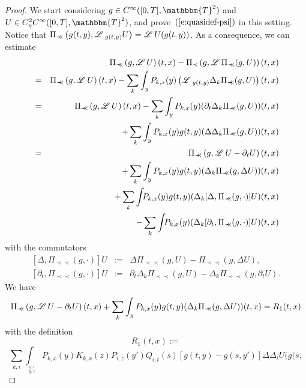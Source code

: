 \documentclass{amsart}
\newcommand{\assign}{:=}
\newcommand{\precprec}{\prec\!\!\!\prec}
\theoremstyle{remark}
\theoremstyle{definition}
\newcommand{\LL}{\mathscr{L} \hspace{.2em}}
\begin{document}
\begin{proof}
  We start considering $g \in C^{\infty} ([0, T], \mathbbm{T}^2)$ and $U \in
  C_{\eta}^2 C^{\infty} ([0, T], \mathbbm{T}^2)$, and
  prove~$(\ref{e:quasidef-psi})$ in this setting. Notice that $\Pi_{\precprec}
  \left( g (t, y), \LL_{g (t, y)} U \right) = \LL U (g (t, y))$. As a
  consequence, we can estimate
  \begin{eqnarray*}
    &  & \Pi_{\precprec} \left( g, \LL U \right) (t, x) - \Pi_{\prec} \left(
    g, \LL \Pi_{\precprec} (g, U) \right) (t, x)\\
    & = & \Pi_{\precprec} \left( g, \LL U \right) (t, x) - \sum_k \int_y
    P_{k, x} (y) \left( \LL_{g (t, y)} \Delta_k \Pi_{\precprec} (g, U) \right)
    (t, x)\\
    & = & \Pi_{\precprec} \left( g, \LL U \right) (t, x) - \sum_k \int_y
    P_{k, x} (y) (\partial_t \Delta_k \Pi_{\precprec} (g, U)) (t, x)\\
    &  & + \sum_k \int_y P_{k, x} (y) g (t, y) (\Delta \Delta_k
    \Pi_{\precprec} (g, U)) (t, x)\\
    & = & \Pi_{\precprec} \left( g, \LL U - \partial_t U \right) (t, x)\\
    &  & + \sum_k \int_y P_{k, x} (y) g (t, y) (\Delta_k \Pi_{\precprec} (g,
    \Delta U)) (t, x)\\
    &  & + \sum_k \int_{} P_{k, x} (y) g (t, y) (\Delta_k [\Delta,
    \Pi_{\precprec} (g, \cdot)] U) (t, x)\\
    &  & - \sum_k \int_{} P_{k, x} (y) (\Delta_k [\partial_t, \Pi_{\precprec}
    (g, \cdot)] U) (t, x)
  \end{eqnarray*}
  with the commutators
  \begin{eqnarray*}
    {}[\Delta, \Pi_{\precprec} (g, \cdot)] U & \assign & \Delta
    \Pi_{\precprec} (g, U) - \Pi_{\precprec} (g, \Delta U),\\
    {}[\partial_t, \Pi_{\precprec} (g, \cdot)] U & \assign & \partial_t
    \Delta_k \Pi_{\precprec} (g, U) - \Delta_k \Pi_{\precprec} (g, \partial_t
    U) .
  \end{eqnarray*}
  We have
  \[ \Pi_{\precprec} \left( g, \LL U - \partial_t U \right) (t, x) + \sum_k
     \int_y P_{k, x} (y) g (t, y) (\Delta_k \Pi_{\precprec} (g, \Delta U)) (t,
     x) = R_1 (t, x) \]
  with the definition
  \[ R_1 (t, x) \assign \]
  \begin{equation}
    \sum_{k, i} \int_{_{\overset{y', s}{y, z}}} P_{k, x} (y) K_{k, x} (z)
    P_{i, z} (y') Q_{i, t} (s) [g (t, y) - g (s, y')] \Delta \Delta_i U (g (s,

\end{equation}
\end{proof}
\end{document}
